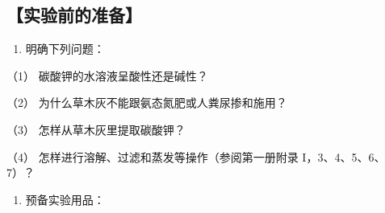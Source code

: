 \subsection{【实验前的准备】}

\begin{enumerate}
\item
  明确下列问题：
\end{enumerate}

（1） 碳酸钾的水溶液呈酸性还是碱性？

（2） 为什么草木灰不能跟氨态氮肥或人粪尿掺和施用？

（3） 怎样从草木灰里提取碳酸钾？

（4） 怎样进行溶解、过滤和蒸发等操作（参阅第一册附录
I，3、4、5、6、7）？

\begin{enumerate}[start=2]
\item
  预备实验用品：
\end{enumerate}

